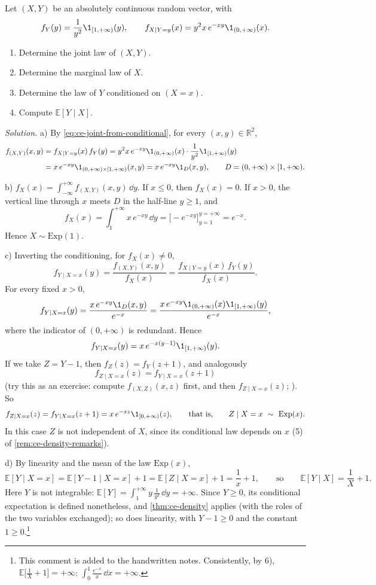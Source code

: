 \begin{example}\label{exa:cp-gamma-conditional}
Let $(X,Y)$ be an absolutely continuous random vector, with
\[
  f_Y(y)=\frac1{y^2}\1_{[1,+\infty)}(y),\qquad f_{X\mid Y=y}(x)=y^2x\,e^{-xy}\1_{(0,+\infty)}(x).
\]
\begin{enumerate}[label=\alph*)]
  \item Determine the joint law of $(X,Y)$.
  \item Determine the marginal law of $X$.
  \item Determine the law of $Y$ conditioned on $(X=x)$.
  \item Compute $\mathbb E[Y\mid X]$.
\end{enumerate}

\emph{Solution.} a) By \eqref{eq:ce-joint-from-conditional}, for every $(x,y)\in\mathbb R^2$,
\[
\begin{aligned}
  f_{(X,Y)}(x,y)&=f_{X\mid Y=y}(x)\,f_Y(y)=y^2x\,e^{-xy}\1_{(0,+\infty)}(x)\cdot\frac1{y^2}\1_{[1,+\infty)}(y)\\
  &=x\,e^{-xy}\1_{(0,+\infty)\times[1,+\infty)}(x,y)=x\,e^{-xy}\1_D(x,y),\qquad D=(0,+\infty)\times[1,+\infty).
\end{aligned}
\]

b) $f_X(x)=\int_{-\infty}^{+\infty}f_{(X,Y)}(x,y)\,\dd y$. If $x\le0$, then $f_X(x)=0$. If $x>0$,
the vertical line through $x$ meets $D$ in the half-line $y\ge1$, and
\[
  f_X(x)=\int_1^{+\infty}x\,e^{-xy}\,\dd y=\Big[-e^{-xy}\Big]_{y=1}^{y=+\infty}=e^{-x}.
\]
Hence $X\sim\mathrm{Exp}(1)$.

c) Inverting the conditioning, for $f_X(x)\ne0$,
\[
  f_{Y\mid X=x}(y)=\frac{f_{(X,Y)}(x,y)}{f_X(x)}=\frac{f_{X\mid Y=y}(x)\,f_Y(y)}{f_X(x)} .
\]
For every fixed $x>0$,
\[
  f_{Y\mid X=x}(y)=\frac{x\,e^{-xy}\1_D(x,y)}{e^{-x}}=\frac{x\,e^{-xy}\1_{(0,+\infty)}(x)\1_{[1,+\infty)}(y)}{e^{-x}},
\]
where the indicator of $(0,+\infty)$ is redundant. Hence
\[
  f_{Y\mid X=x}(y)=x\,e^{-x(y-1)}\1_{[1,+\infty)}(y).
\]
If we take $Z=Y-1$, then $f_Z(z)=f_Y(z+1)$, and analogously
\[
  f_{Z\mid X=x}(z)=f_{Y\mid X=x}(z+1)
\]
(try this as an exercise: compute $f_{(X,Z)}(x,z)$ first, and then $f_{Z\mid X=x}(z)$;
). So
\[
  f_{Z\mid X=x}(z)=f_{Y\mid X=x}(z+1)=x\,e^{-xz}\1_{[0,+\infty)}(z),
  \qquad\text{that is,}\qquad Z\mid X=x\ \sim\ \mathrm{Exp}(x).
\]
In this case $Z$ is not independent of $X$, since its conditional law depends on $x$ (5) of
\cref{rem:ce-density-remarks}).

d) By linearity and the mean of the law $\mathrm{Exp}(x)$,
\[
  \mathbb E[Y\mid X=x]=\mathbb E[Y-1\mid X=x]+1=\mathbb E[Z\mid X=x]+1=\frac1x+1,
  \qquad\text{so}\qquad\mathbb E[Y\mid X]=\frac1X+1 .
\]
Here $Y$ is not integrable: $\mathbb E[Y]=\int_1^{+\infty}y\,\frac1{y^2}\,\dd y=+\infty$. Since
$Y\ge0$, its conditional expectation is defined nonetheless, and \cref{thm:ce-density} applies
(with the roles of the two variables exchanged); so does linearity, with $Y-1\ge0$ and the
constant $1\ge0$.\footnote{This comment is added to the handwritten notes. Consistently, by 6),
$\mathbb E\big[\frac1X+1\big]=+\infty$: $\int_0^1\frac{e^{-x}}x\,\dd x=+\infty$.}
\end{example}

